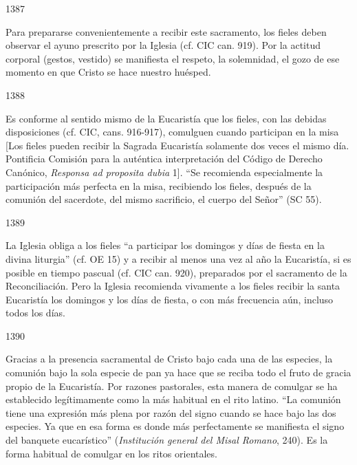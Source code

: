 			\begin{ccebody}\begin{ccenumber}1387\end{ccenumber} Para prepararse convenientemente a recibir este sacramento, los fieles deben observar el ayuno prescrito por la Iglesia (cf. CIC can. 919). Por la actitud corporal (gestos, vestido) se manifiesta el respeto, la solemnidad, el gozo de ese momento en que Cristo se hace nuestro huésped.\end{ccebody}
			
			\begin{ccebody}\begin{ccenumber}1388\end{ccenumber} Es conforme al sentido mismo de la Eucaristía que los fieles, con las debidas disposiciones (cf. CIC, cans. 916-917), comulguen cuando participan en la misa [Los fieles pueden recibir la Sagrada Eucaristía solamente dos veces el mismo día. Pontificia Comisión para la auténtica interpretación del Código de Derecho Canónico, \textit{Responsa ad proposita dubia} 1]. “Se recomienda especialmente la participación más perfecta en la misa, recibiendo los fieles, después de la comunión del sacerdote, del mismo sacrificio, el cuerpo del Señor” (SC 55).\end{ccebody}
			
			\begin{ccebody}\begin{ccenumber}1389\end{ccenumber} La Iglesia obliga a los fieles “a participar los domingos y días de fiesta en la divina liturgia” (cf. OE 15) y a recibir al menos una vez al año la Eucaristía, si es posible en tiempo pascual (cf. CIC can. 920), preparados por el sacramento de la Reconciliación. Pero la Iglesia recomienda vivamente a los fieles recibir la santa Eucaristía los domingos y los días de fiesta, o con más frecuencia aún, incluso todos los días.\end{ccebody}
			
			\begin{ccebody}\begin{ccenumber}1390\end{ccenumber} Gracias a la presencia sacramental de Cristo bajo cada una de las especies, la comunión bajo la sola especie de pan ya hace que se reciba todo el fruto de gracia propio de la Eucaristía. Por razones pastorales, esta manera de comulgar se ha establecido legítimamente como la más habitual en el rito latino. “La comunión tiene una expresión más plena por razón del signo cuando se hace bajo las dos especies. Ya que en esa forma es donde más perfectamente se manifiesta el signo del banquete eucarístico” (\textit{Institución general del Misal Romano}, 240). Es la forma habitual de comulgar en los ritos orientales.\end{ccebody}
			
